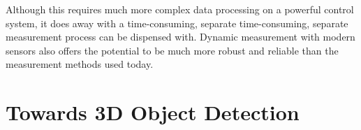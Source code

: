 Although this requires much more complex data processing on a powerful control system, it does away with a time-consuming, separate 
time-consuming, separate measurement process can be dispensed with. Dynamic measurement with modern sensors also offers the potential to be much more robust and reliable than the measurement methods used today.
    
    
    
    

\section{Towards 3D Object Detection}\label{chap:1:detection}
\lipsum[2-5]

        
        

